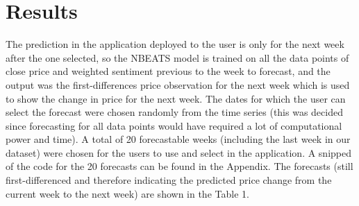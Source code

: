 \documentclass{article}
\begin{document}
\section{Results}
The prediction in the application deployed to the user is only for the next week after the one selected, so the NBEATS model is trained on all the data points of close price and weighted sentiment previous to the week to forecast, and the output was the first-differences price observation for the next week which is used to show the change in price for the next week. The dates for which the user can select the forecast were chosen randomly from the time series (this was decided since forecasting for all data points would have required a lot of computational power and time). A total of 20 forecastable weeks (including the last week in our dataset) were chosen for the users to use and select in the application. A snipped of the code for the 20 forecasts can be found in the Appendix. The forecasts (still first-differenced and therefore indicating the predicted price change from the current week to the next week) are shown in the Table 1.  
\end{document}
